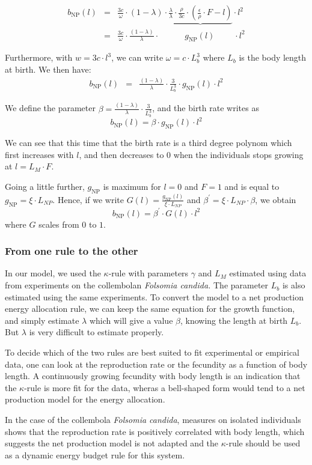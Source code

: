 \begin{eqnarray*}
b_{\text{NP}}(l) & = & \frac{3c}{\omega}\cdot(1-\lambda)\cdot\underbrace{\frac{\lambda}{\lambda}\cdot\frac{\rho}{3c}\cdot\left(\frac{\epsilon}{\rho}\cdot F-l\right)}\cdot l^{2}\\
 & = & \frac{3c}{\omega}\cdot\frac{(1-\lambda)}{\lambda}\cdot\qquad\quad g_{\text{NP}}(l)\;\qquad\cdot l^{2}
\end{eqnarray*}


Furthermore, with $w=3c\cdot l^{3}$, we can write $\omega=c\cdot L_{b}^{3}$
where $L_{b}$ is the body length at birth. We then have:
\begin{eqnarray*}
b_{\text{NP}}(l) & = & \frac{(1-\lambda)}{\lambda}\cdot\frac{3}{L_{b}^{3}}\cdot g_{\text{NP}}(l)\cdot l^{2}
\end{eqnarray*}


We define the parameter ${\displaystyle \beta=\frac{(1-\lambda)}{\lambda}\cdot\frac{3}{L_{b}^{3}}}$,
and the birth rate writes as
\[
b_{\text{NP}}(l)=\beta\cdot g_{\text{NP}}(l)\cdot l^{2}
\]


We can see that this time that the birth rate is a third degree polynom
which first increases with $l$, and then decreases to $0$ when the
individuals stops growing at $l=L_{M}\cdot F$.

Going a little further, $g_{\text{NP}}$ is maximum for $l=0$ and
$F=1$ and is equal to $g_{\text{NP}}=\xi\cdot L_{NP}$. Hence, if
we write ${\displaystyle G(l)=\frac{g_{\text{NP}}(l)}{\xi\cdot L_{NP}}}$
and ${\displaystyle \beta^{'}=\xi\cdot L_{NP}\cdot\beta}$, we obtain
\[
b_{\text{NP}}(l)=\beta^{'}\cdot G(l)\cdot l^{2}
\]
 where $G$ scales from $0$ to $1$.


\subsubsection{From one rule to the other}

In our model, we used the $\kappa$-rule with parameters $\gamma$
and $L_{M}$ estimated using data from experiments on the collembolan
\textit{Folsomia candida. }The parameter $L_{b}$ is also estimated
using the same experiments. To convert the model to a net production
energy allocation rule, we can keep the same equation for the growth
function, and simply estimate $\lambda$ which will give a value $\beta$,
knowing the length at birth $L_{b}$. But $\lambda$ is very difficult
to estimate properly. 

To decide which of the two rules are best suited to fit experimental
or empirical data, one can look at the reproduction rate or the fecundity
as a function of body length. A continuously growing fecundity with
body length is an indication that the $\kappa$-rule is more fit for
the data, wheras a bell-shaped form would tend to a net production
model for the energy allocation. 

In the case of the collembola \textit{Folsomia candida}, measures
on isolated individuals shows that the reproduction rate is positively
correlated with body length, which suggests the net production model
is not adapted and the $\kappa$-rule should be used as a dynamic
energy budget rule for this system.